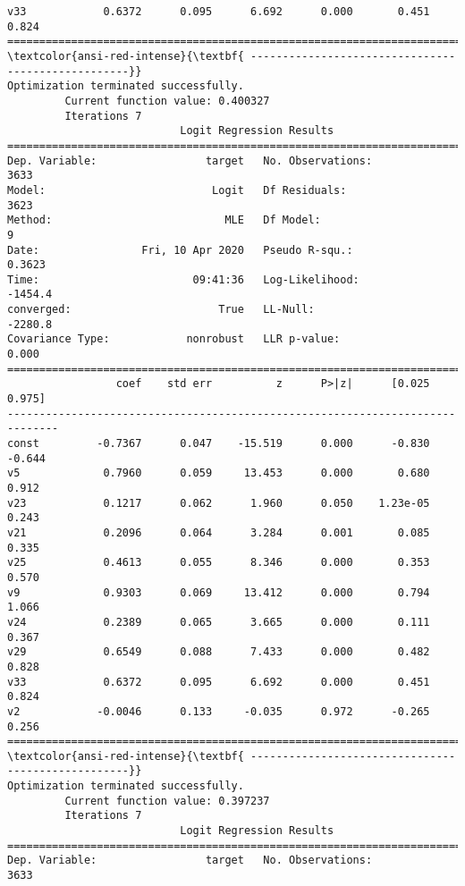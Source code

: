 \documentclass[11pt]{article}
\begin{document}
\begin{Verbatim}[commandchars=\\\{\}]
v33            0.6372      0.095      6.692      0.000       0.451       0.824
==============================================================================
\textcolor{ansi-red-intense}{\textbf{ ---------------------------------------------------}}
Optimization terminated successfully.
         Current function value: 0.400327
         Iterations 7
                           Logit Regression Results                           
==============================================================================
Dep. Variable:                 target   No. Observations:                 3633
Model:                          Logit   Df Residuals:                     3623
Method:                           MLE   Df Model:                            9
Date:                Fri, 10 Apr 2020   Pseudo R-squ.:                  0.3623
Time:                        09:41:36   Log-Likelihood:                -1454.4
converged:                       True   LL-Null:                       -2280.8
Covariance Type:            nonrobust   LLR p-value:                     0.000
==============================================================================
                 coef    std err          z      P>|z|      [0.025      0.975]
------------------------------------------------------------------------------
const         -0.7367      0.047    -15.519      0.000      -0.830      -0.644
v5             0.7960      0.059     13.453      0.000       0.680       0.912
v23            0.1217      0.062      1.960      0.050    1.23e-05       0.243
v21            0.2096      0.064      3.284      0.001       0.085       0.335
v25            0.4613      0.055      8.346      0.000       0.353       0.570
v9             0.9303      0.069     13.412      0.000       0.794       1.066
v24            0.2389      0.065      3.665      0.000       0.111       0.367
v29            0.6549      0.088      7.433      0.000       0.482       0.828
v33            0.6372      0.095      6.692      0.000       0.451       0.824
v2            -0.0046      0.133     -0.035      0.972      -0.265       0.256
==============================================================================
\textcolor{ansi-red-intense}{\textbf{ ---------------------------------------------------}}
Optimization terminated successfully.
         Current function value: 0.397237
         Iterations 7
                           Logit Regression Results                           
==============================================================================
Dep. Variable:                 target   No. Observations:                 3633

\end{Verbatim}
\end{document}
